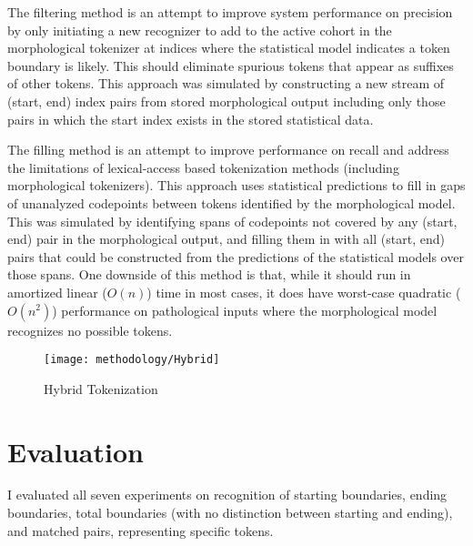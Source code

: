 The filtering method is an attempt to improve system performance on precision by only initiating a new recognizer to add to the active cohort in the morphological tokenizer at indices where the statistical model indicates a token boundary is likely. This should eliminate spurious tokens that appear as suffixes of other tokens. This approach was simulated by constructing a new stream of (start, end) index pairs from stored morphological output including only those pairs in which the start index exists in the stored statistical data.

The filling method is an attempt to improve performance on recall and address the limitations of lexical-access based tokenization methods (including morphological tokenizers). This approach uses statistical predictions to fill in gaps of unanalyzed codepoints between tokens identified by the morphological model. This was simulated by identifying spans of codepoints not covered by any (start, end) pair in the morphological output, and filling them in with all (start, end) pairs that could be constructed from the predictions of the statistical models over those spans. One downside of this method is that, while it should run in amortized linear ($O(n)$) time in most cases, it does have worst-case quadratic ($O(n^2)$) performance on pathological inputs where the morphological model recognizes no possible tokens.

\begin{figure}
	\texttt{[image: methodology/Hybrid]}
	\caption{Hybrid Tokenization}
	\label{hybriddiagram}
\end{figure}

\section{Evaluation}
I evaluated all seven experiments on recognition of starting boundaries, ending boundaries, total boundaries (with no distinction between starting and ending), and matched pairs, representing specific tokens.

